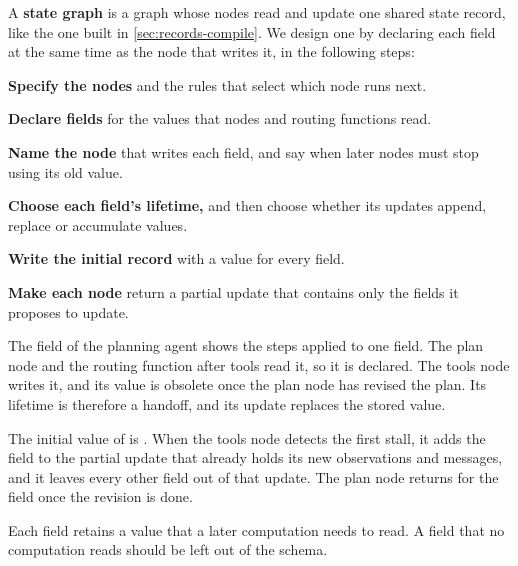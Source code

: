 A \textbf{state graph} is a graph whose nodes read and update one shared state record, like the one
built in \cref{sec:records-compile}. We design one by declaring each field at the same time as the
node that writes it, in the following steps:
\be
\item \textbf{Specify the nodes} and the rules that select which node runs next.
\item \textbf{Declare fields} for the values that nodes and routing functions read.
\item \textbf{Name the node} that writes each field, and say when later nodes must stop using its
old value.
\item \textbf{Choose each field's lifetime,} and then choose whether its updates append, replace or
accumulate values.
\item \textbf{Write the initial record} with a value for every field.
\item \textbf{Make each node} return a partial update that contains only the fields it proposes to
update.
\ee

The field  of the planning agent shows the steps applied to one field. The
plan node and the routing function after tools read it, so it is declared. The tools node writes
it, and its value is obsolete once the plan node has revised the plan. Its lifetime is therefore a
handoff, and its update replaces the stored value.

The initial value of  is . When the tools node detects the first
stall, it adds the field to the partial update that already holds its new observations and messages,
and it leaves every other field out of that update. The plan node returns  for the
field once the revision is done.

Each field retains a value that a later computation needs to read. A field that no computation
reads should be left out of the schema.

